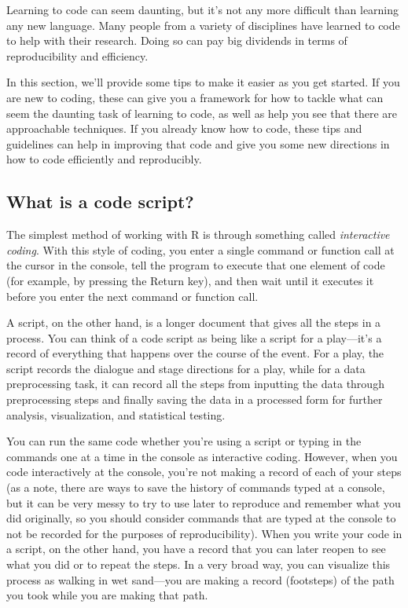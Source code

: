 \documentclass[]{tufte-book}
\begin{document}
Learning to code can seem daunting, but it's not any more difficult than
learning any new language. Many people from a variety of disciplines have
learned to code to help with their research. Doing so can pay big dividends in
terms of reproducibility and efficiency.

In this section, we'll provide some tips to make it easier as you get started.
If you are new to coding, these can give you a framework for how to tackle what
can seem the daunting task of learning to code, as well as help you see that
there are approachable techniques. If you already know how to code, these tips
and guidelines can help in improving that code and give you some new directions
in how to code efficiently and reproducibly.

\subsection{What is a code script?}\label{what-is-a-code-script}

The simplest method of working with R is through something called \emph{interactive
coding}. With this style of coding, you enter a single command or function call
at the cursor in the console, tell the program to execute that one element of
code (for example, by pressing the Return key), and then wait until it executes
it before you enter the next command or function call.

A script, on the other hand, is a longer document that gives all the steps in a
process. You can think of a code script as being like a script for a play---it's
a record of everything that happens over the course of the event. For a play,
the script records the dialogue and stage directions for a play, while for a
data preprocessing task, it can record all the steps from inputting the data
through preprocessing steps and finally saving the data in a processed form for
further analysis, visualization, and statistical testing.

You can run the same code whether you're using a script or typing in the
commands one at a time in the console as interactive coding. However, when you
code interactively at the console, you're not making a record of each of your
steps (as a note, there are ways to save the history of commands typed at a
console, but it can be very messy to try to use later to reproduce and remember
what you did originally, so you should consider commands that are typed at the
console to not be recorded for the purposes of reproducibility). When you write
your code in a script, on the other hand, you have a record that you can
later reopen to see what you did or to repeat the steps. In a very broad way,
you can visualize this process as walking in wet sand---you are making a record
(footsteps) of the path you took while you are making that path.
\end{document}
